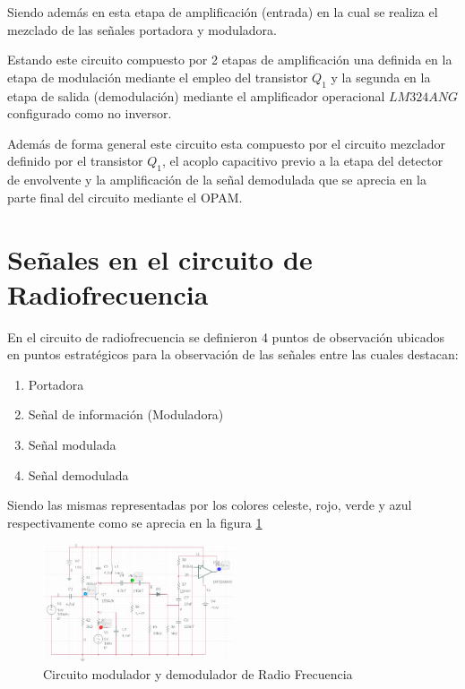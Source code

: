 \documentclass[conference]{IEEEtran}
\begin{document}
	Siendo además en esta etapa de amplificación (entrada) en la cual se realiza el mezclado de las señales portadora y moduladora.
	
	Estando este circuito compuesto por 2 etapas de amplificación una definida en la etapa de modulación mediante el empleo del transistor $Q_1$ y la segunda en la etapa de salida (demodulación) mediante el amplificador operacional $LM324ANG$ configurado como no inversor.
	
	Además de forma general este circuito esta compuesto por el circuito mezclador definido por el transistor $Q_1$, el acoplo capacitivo previo a la etapa del detector de envolvente y la amplificación de la señal demodulada que se aprecia en la parte final del circuito mediante el OPAM.
	
	\section{Señales en el circuito de Radiofrecuencia}
	
	En el circuito de radiofrecuencia se definieron 4 puntos de observación ubicados en puntos estratégicos para la observación de las señales entre las cuales destacan:
	
	\begin{enumerate}
		\item Portadora
		\item Señal de información (Moduladora)
		\item Señal modulada
		\item Señal demodulada
	\end{enumerate}
	
	Siendo las mismas representadas por los colores celeste, rojo, verde y azul respectivamente como se aprecia en la figura \ref{fig:circuito-modulador} 
	
	\begin{figure}[h]
		\centering
		\includegraphics[width=0.5\textwidth]{media/circuito-modulador}
		\caption{Circuito modulador y demodulador de Radio Frecuencia}
		\label{fig:circuito-modulador}
	\end{figure}
	
\end{document}
